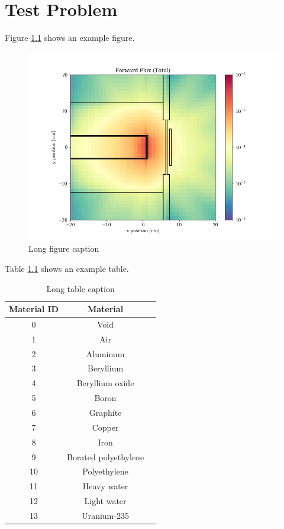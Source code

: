 \chapter{Test Problem}
\label{chap:testprob}

Figure \ref{fig:testprob:flux} shows an example figure.

\begin{figure}[h!]
  \centering
  \includegraphics[width=1.0\textwidth]{content/scalar_flux_fwd_total.png}
  \caption[Short figure caption]{Long figure caption}
  \label{fig:testprob:flux}
\end{figure}

Table \ref{tab:testprob:mats} shows an example table.

\begin{table}[h]
  \centering
  \caption[Short table caption]{Long table caption}
  \label{tab:testprob:mats}
  \begin{tabular}{| c | c | c |}
    \hline
    \textbf{Material ID} & \textbf{Material} \\ \hline
     0 & Void                 \\ \hline
     1 & Air                  \\ \hline
     2 & Aluminum             \\ \hline
     3 & Beryllium            \\ \hline
     4 & Beryllium oxide      \\ \hline
     5 & Boron                \\ \hline
     6 & Graphite             \\ \hline
     7 & Copper               \\ \hline
     8 & Iron                 \\ \hline
     9 & Borated polyethylene \\ \hline
    10 & Polyethylene         \\ \hline
    11 & Heavy water          \\ \hline
    12 & Light water          \\ \hline
    13 & Uranium-235          \\ \hline
  \end{tabular}
\end{table}
